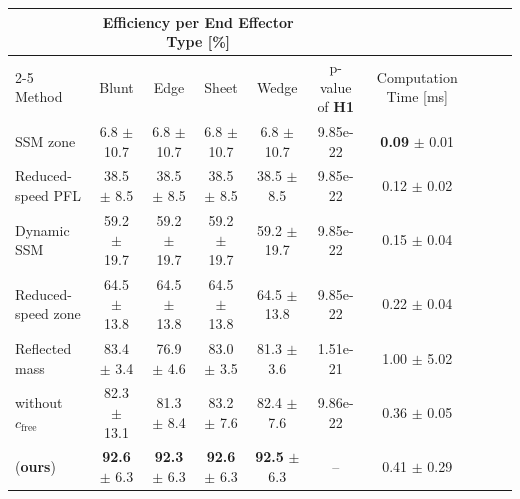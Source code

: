 \begin{tabular}{lccccccccc}
\toprule
  & \multicolumn{4}{c}{Efficiency per End Effector Type [\%]} &    &     \\
\cmidrule(lr){2-5}
Method & Blunt & Edge & Sheet & Wedge & p-value of \textbf{{H1}} & Computation Time [ms] \\
\midrule
SSM zone \cite{iso_2021_RoboticsSafety} & 6.8 $\pm$ 10.7 & 6.8 $\pm$ 10.7 & 6.8 $\pm$ 10.7 & 6.8 $\pm$ 10.7 & 9.85e-22 & \textbf{0.09} $\pm$ 0.01 \\
Reduced-speed PFL \cite{iso_2021_RoboticsSafety} & 38.5 $\pm$ 8.5 & 38.5 $\pm$ 8.5 & 38.5 $\pm$ 8.5 & 38.5 $\pm$ 8.5 & 9.85e-22 & 0.12 $\pm$ 0.02 \\
Dynamic SSM \cite{beckert_2017_OnlineVerification, thumm_2022_ProvablySafe} & 59.2 $\pm$ 19.7 & 59.2 $\pm$ 19.7 & 59.2 $\pm$ 19.7 & 59.2 $\pm$ 19.7 & 9.85e-22 & 0.15 $\pm$ 0.04 \\
Reduced-speed zone \cite{svarny_2019_SafePhysical} & 64.5 $\pm$ 13.8 & 64.5 $\pm$ 13.8 & 64.5 $\pm$ 13.8 & 64.5 $\pm$ 13.8 & 9.85e-22 & 0.22 $\pm$ 0.04 \\
Reflected mass \cite{haddadin_2012_MakingRobots} & 83.4 $\pm$ 3.4 & 76.9 $\pm$ 4.6 & 83.0 $\pm$ 3.5 & 81.3 $\pm$ 3.6 & 1.51e-21 & 1.00 $\pm$ 5.02 \\
\shield{} without $c_{\mathrm{free}}$ & 82.3 $\pm$ 13.1 & 81.3 $\pm$ 8.4 & 83.2 $\pm$ 7.6 & 82.4 $\pm$ 7.6 & 9.86e-22 & 0.36 $\pm$ 0.05 \\
\shield{} (\textbf{ours}) & \textbf{92.6} $\pm$ 6.3 & \textbf{92.3} $\pm$ 6.3 & \textbf{92.6} $\pm$ 6.3 & \textbf{92.5} $\pm$ 6.3 & -- & 0.41 $\pm$ 0.29 \\
\bottomrule
\end{tabular}